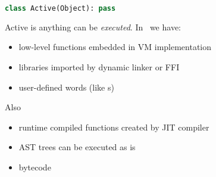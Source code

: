 \clearpage{}

\begin{lstlisting}[language=Python]
class Active(Object): pass
\end{lstlisting}

\noindent Active is anything can be \emph{executed}. In \F\ we have:
\begin{itemize}[nosep]
  \item low-level functions embedded in VM implementation
  \item libraries imported by dynamic linker or FFI
  \item user-defined words (like s) 
\end{itemize}
Also
\begin{itemize}[nosep]
  \item runtime compiled functions created by JIT compiler
  \item AST trees can be executed as is
  \item bytecode
\end{itemize}
